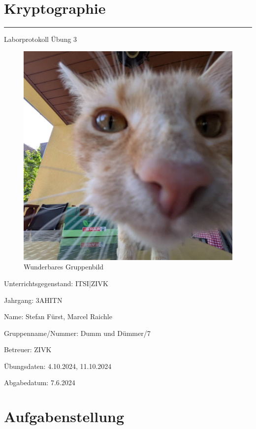 \documentclass[a4paper]{article}
\begin{document}

\pagestyle{oida}
\section*{Kryptographie}
\par\noindent\rule{\textwidth}{0.4pt}

Laborprotokoll
Übung 3

\begin{figure}[h]
	\includegraphics[scale=0.3]{images/mika.jpeg}
	\caption{Wunderbares Gruppenbild}
\end{figure}

\vspace*{\fill}
Unterrichtsgegenstand:	ITSI|ZIVK

Jahrgang:	3AHITN

Name:	Stefan Fürst, Marcel Raichle

Gruppenname/Nummer: Dumm und Dümmer/7

Betreuer: 	ZIVK

Übungsdaten:	4.10.2024, 11.10.2024

Abgabedatum:	7.6.2024


\newpage
\tableofcontents

\newpage

\section{Aufgabenstellung}
\end{document}
